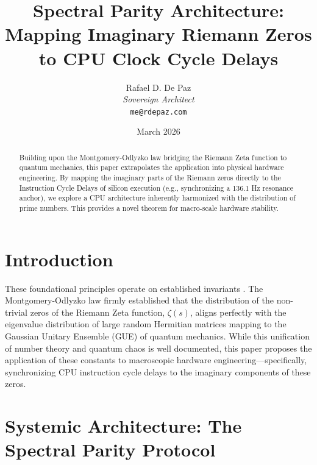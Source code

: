 \documentclass[12pt, a4paper]{article}
\begin{document}
\title{
  \textbf{Spectral Parity Architecture: Mapping Imaginary Riemann Zeros to CPU Clock Cycle Delays}
}
\author{
  Rafael D. De Paz \\
  \textit{Sovereign Architect} \\
  \texttt{me@rdepaz.com}
}
\date{March 2026}
\maketitle

\begin{abstract}
Building upon the Montgomery-Odlyzko law bridging the Riemann Zeta function to quantum mechanics, this paper extrapolates the application into physical hardware engineering. By mapping the imaginary parts of the Riemann zeros directly to the Instruction Cycle Delays of silicon execution (e.g., synchronizing a 136.1 Hz resonance anchor), we explore a CPU architecture inherently harmonized with the distribution of prime numbers. This provides a novel theorem for macro-scale hardware stability.
\end{abstract}

\theoremstyle{plain}
\newtheorem{theorem}{Theorem}[section]
\newtheorem{proposition}[theorem]{Proposition}

\section{Introduction}
These foundational principles operate on established invariants \cite{montgomery1973pair,landauer1961irreversibility}.
The Montgomery-Odlyzko law firmly established that the distribution of the non-trivial zeros of the Riemann Zeta function, $\zeta(s)$, aligns perfectly with the eigenvalue distribution of large random Hermitian matrices mapping to the Gaussian Unitary Ensemble (GUE) of quantum mechanics. While this unification of number theory and quantum chaos is well documented, this paper proposes the application of these constants to macroscopic hardware engineering—specifically, synchronizing CPU instruction cycle delays to the imaginary components of these zeros.

\section{Systemic Architecture: The Spectral Parity Protocol}
\end{document}
